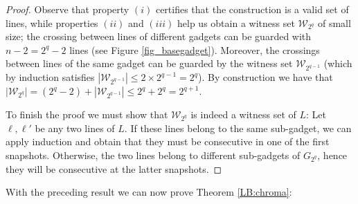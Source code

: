 \documentclass[11pt,a4paper]{article}
\begin{document}
\begin{proof}
Observe that property $(i)$ certifies that the construction is a valid set of lines, while properties $(ii)$ and $(iii)$ help us obtain a witness set $\mathcal{W}_{2^q}$ of small size; the crossing between lines of different gadgets  can be guarded with $n-2=2^q-2$ lines (see Figure \ref{fig_basegadget}). Moreover, the crossings between lines of the same gadget can be guarded by the witness set $\mathcal{W}_{2^{q-1}}$ (which by induction satisfies $|\mathcal{W}_{2^{q-1}}|\leq 2\times 2^{q-1} =2^q$). By construction we have that $|\mathcal{W}_{2^q}|= (2^q-2)+ |\mathcal{W}_{2^{q-1}}| \leq 2^q + 2^q =2^{q+1}$.

To finish the proof we must show that $\mathcal{W}_{2^q}$ is indeed a witness set of $L$: Let $\ell,\ell'$ be any two lines of $L$. If these lines belong to the same sub-gadget, we can apply induction and obtain that they must be consecutive in one of the first snapshots. Otherwise, the two lines belong to different sub-gadgets of $G_{2^q}$, hence they will be consecutive at the latter snapshots.
\end{proof}

With the preceding result we can now prove Theorem \ref{LB:chroma}:
\end{document}
